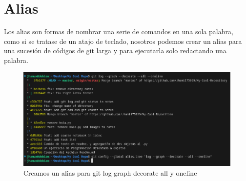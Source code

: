 \documentclass[13pt]{article}
\begin{document}
\section{Alias}
Los alias son formas de nombrar una serie de comandos en una sola palabra, como si se tratase de un atajo de teclado, nosotros podemos crear un alias para una sucesión de códigos de git larga y para ejecutarla solo redactando una palabra.\\

\begin{figure}[!h]
	\centering
	\includegraphics[scale = 0.6]{Images/alias1.png}
	\caption {\small Creamos un alias para git log graph decorate all y oneline}
\end{figure}
\end{document}
